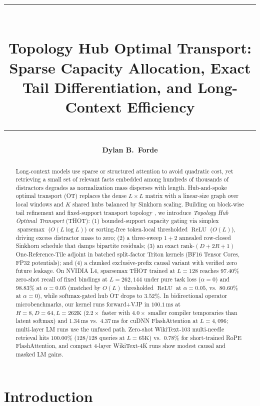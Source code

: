 \documentclass[11pt]{article}
\title{\vspace{-1.2em}\rule{\linewidth}{1.2pt}\\[0.55em]
\textbf{Topology Hub Optimal Transport:}\\
Sparse Capacity Allocation, Exact Tail Differentiation, and Long-Context Efficiency\\[0.35em]
\rule{\linewidth}{0.6pt}}
\author{\textbf{Dylan B.~Forde}}
\date{}
\newcommand{\ReLU}{\operatorname{ReLU}}
\newcommand{\sparsemax}{\operatorname{sparsemax}}
\begin{document}
\maketitle
\vspace{-1.2em}

\begin{abstract}
Long-context models use sparse or structured attention to avoid quadratic cost, yet retrieving a small set of relevant facts embedded among hundreds of thousands of distractors degrades as normalization mass disperses with length. Hub-and-spoke optimal transport (OT) replaces the dense $L \times L$ matrix with a linear-size graph over local windows and $K$ shared hubs balanced by Sinkhorn scaling. Building on block-wise tail refinement and fixed-support transport topology \citep{forde2026blockwise,forde2026topology}, we introduce \emph{Topology Hub Optimal Transport} (THOT): (1) bounded-support capacity gating via simplex $\sparsemax$ ($O(L\log L)$) or sorting-free token-local thresholded $\ReLU$ ($O(L)$), driving excess distractor mass to zero; (2) a three-sweep $1+2$ annealed row-closed Sinkhorn schedule that damps bipartite residuals; (3) an exact rank-$(D+2R+1)$ One-Reference-Tile adjoint in batched split-factor Triton kernels (BF16 Tensor Cores, FP32 potentials); and (4) a chunked exclusive-prefix causal variant with verified zero future leakage. On NVIDIA L4, sparsemax THOT trained at $L=128$ reaches $97.40\%$ zero-shot recall of fixed bindings at $L=262{,}144$ under pure task loss ($\alpha=0$) and $98.83\%$ at $\alpha=0.05$ (matched by $O(L)$ thresholded $\ReLU$ at $\alpha=0.05$, vs.\ $80.60\%$ at $\alpha=0$), while softmax-gated hub OT drops to $3.52\%$. In bidirectional operator microbenchmarks, our kernel runs forward+VJP in $100.1\,\text{ms}$ at $H=8, D=64, L=262\text{K}$ ($2.2\times$ faster with $4.0\times$ smaller compiler temporaries than latent softmax) and $1.34\,\text{ms}$ vs.\ $4.37\,\text{ms}$ for cuDNN FlashAttention at $L=4{,}096$; multi-layer LM runs use the unfused path. Zero-shot WikiText-103 multi-needle retrieval hits $100.00\%$ ($128/128$ queries at $L=65\text{K}$) vs.\ $0.78\%$ for short-trained RoPE FlashAttention, and compact 4-layer WikiText-4K runs show modest causal and masked LM gains.
\end{abstract}

\section{Introduction}
\label{sec:intro}
\end{document}
